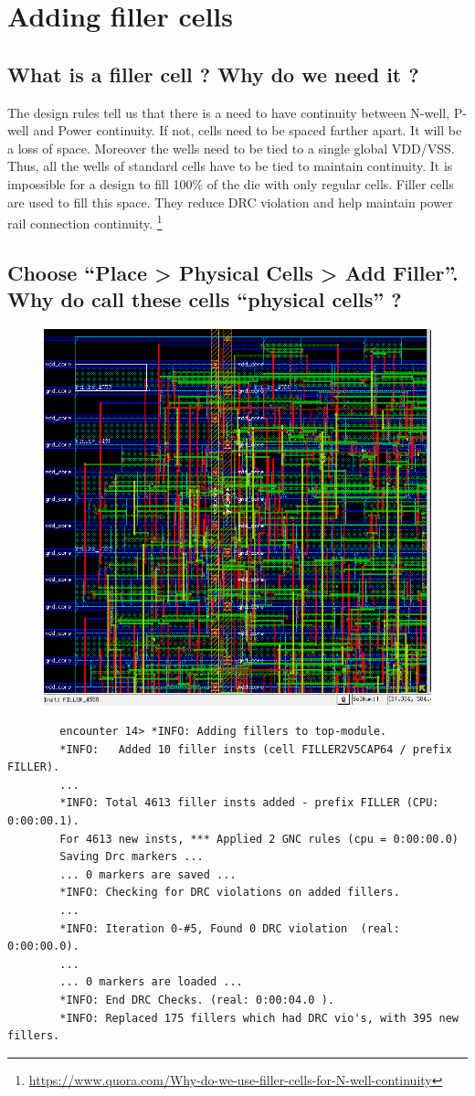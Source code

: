 \documentclass[11pt,a4paper,sans,dvipsnames]{report}
\begin{document}
	\newpage
	\section{Adding filler cells}

	\subsection*{What is a filler cell ? Why do we need it ?}
	The design rules tell us that there is a need to have continuity between N-well, P-well and Power continuity. If not, cells need to be spaced farther apart. It will be a loss of space.
	Moreover the wells need to be tied to a single global VDD/VSS. Thus,  all the wells of standard cells have to be tied to maintain continuity. It is impossible for a design to fill 100\% of the die with only regular cells. Filler cells are used to fill this space. They reduce DRC violation and help maintain power rail connection continuity.
	\footnote{\url{https://www.quora.com/Why-do-we-use-filler-cells-for-N-well-continuity}}

	\subsection*{Choose “Place > Physical Cells > Add Filler”. Why do call these cells “physical cells” ?}

	\begin{figure}[h!]
		\centering
		\includegraphics[width=0.60\linewidth, frame]{images/fillercell.png}
		\label{fig:filler_cell}
	\end{figure}

	\begin{lstlisting}
		encounter 14> *INFO: Adding fillers to top-module.
		*INFO:   Added 10 filler insts (cell FILLER2V5CAP64 / prefix FILLER).
		...
		*INFO: Total 4613 filler insts added - prefix FILLER (CPU: 0:00:00.1).
		For 4613 new insts, *** Applied 2 GNC rules (cpu = 0:00:00.0)
		Saving Drc markers ...
		... 0 markers are saved ...
		*INFO: Checking for DRC violations on added fillers.
		...
		*INFO: Iteration 0-#5, Found 0 DRC violation  (real: 0:00:00.0).
		...
		... 0 markers are loaded ...
		*INFO: End DRC Checks. (real: 0:00:04.0 ).
		*INFO: Replaced 175 fillers which had DRC vio's, with 395 new fillers.
	\end{lstlisting}
\end{document}
